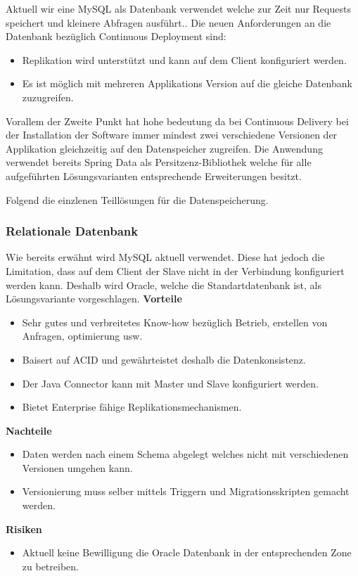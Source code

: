 Aktuell wir eine MySQL als Datenbank verwendet welche zur Zeit nur Requests speichert und kleinere Abfragen ausführt.. Die neuen Anforderungen an die Datenbank bezüglich Continuous Deployment sind:
\begin{itemize}
	\item Replikation wird unterstützt und kann auf dem Client konfiguriert werden.
	\item Es ist möglich mit mehreren Applikations Version auf die gleiche Datenbank zuzugreifen.
\end{itemize}
Vorallem der Zweite Punkt hat hohe bedeutung da bei Continuous Delivery bei der Installation der Software immer mindest zwei verschiedene Versionen der Applikation gleichzeitig auf den Datenspeicher zugreifen. Die Anwendung verwendet bereits Spring Data als Persitzenz-Bibliothek welche für alle aufgeführten Lösungsvarianten entsprechende Erweiterungen besitzt.

Folgend die einzlenen Teillösungen für die Datenspeicherung.

\subsubsection{Relationale Datenbank}

Wie bereits erwähnt wird MySQL aktuell verwendet. Diese hat jedoch die Limitation, dass auf dem Client der Slave nicht in der Verbindung konfiguriert werden kann. Deshalb wird Oracle, welche die Standartdatenbank ist, als Lösungsvariante vorgeschlagen.
\newline
\textbf{Vorteile}
\begin{itemize}
	\item Sehr gutes und verbreitetes Know-how bezüglich Betrieb, erstellen von Anfragen, optimierung usw.
	\item Baisert auf ACID und gewährteistet deshalb die Datenkonsistenz.
	\item Der Java Connector kann mit Master und Slave konfiguriert werden.
	\item Bietet Enterprise fähige Replikationsmechanismen.
\end{itemize}
\textbf{Nachteile}
\begin{itemize}
	\item Daten werden nach einem Schema abgelegt welches nicht mit verschiedenen Versionen umgehen kann.
	\item Versionierung muss selber mittels Triggern und Migrationsskripten gemacht werden.	
\end{itemize}
\textbf{Risiken}
\begin{itemize}
	\item Aktuell keine Bewilligung die Oracle Datenbank in der entsprechenden Zone zu betreiben.
\end{itemize}


